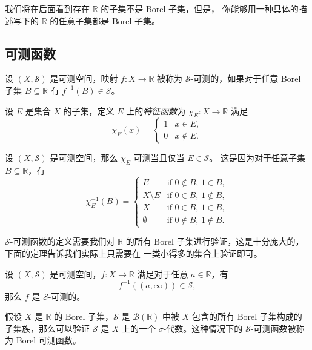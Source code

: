 \documentclass[fontset=none]{Notes}
\begin{document}
我们将在后面看到存在 $\mathbb{R}$ 的子集不是 Borel 子集，但是，
你能够用一种具体的描述写下的 $\mathbb{R}$ 的任意子集都是 Borel 子集。

\subsection{可测函数}

\begin{definition}
  设 $(X,\mathcal{S})$ 是可测空间，映射 $f:X\to \mathbb{R}$ 被称为
  $\mathcal{S}$-可测的，如果对于任意 Borel 子集 $B\subseteq \mathbb{R}$
  有 $f^{-1}(B)\in \mathcal{S}$。
\end{definition}

\begin{definition}
  设 $E$ 是集合 $X$ 的子集，定义 $E$ 上的\emph{特征函数}为 $\chi_E:X\to \mathbb{R}$
  满足 
  \[
    \chi_E(x)=\begin{cases}
      1 & x\in E,\\
      0 & x\notin E.
    \end{cases}
  \]
\end{definition}

\begin{example}
  设 $(X,\mathcal{S})$ 是可测空间，那么 $\chi_E$ 可测当且仅当 $E\in \mathcal{S}$。
  这是因为对于任意子集 $B\subseteq \mathbb{R}$，有
  \[
    \chi_E^{-1}(B)=\begin{cases}
      E & \text{if $0\notin B$, $1\in B$},\\
      X \setminus E & \text{if $0\in B$, $1\notin B$},\\
      X & \text{if $0\in B$, $1\in B$},\\
      \emptyset & \text{if $0\notin B$, $1\notin B$}.
    \end{cases}
  \]
\end{example}

$\mathcal{S}$-可测函数的定义需要我们对 $\mathbb{R}$ 的所有 Borel
子集进行验证，这是十分庞大的，下面的定理告诉我们实际上只需要在
一类小得多的集合上验证即可。

\begin{theorem}
  设 $(X,\mathcal{S})$ 是可测空间，$f:X\to \mathbb{R}$ 满足对于任意
  $a\in \mathbb{R}$，有
  \[
    f^{-1}((a,\infty))\in \mathcal{S},
  \]
  那么 $f$ 是 $\mathcal{S}$-可测的。
\end{theorem}

假设 $X$ 是 $\mathbb{R}$ 的 Borel 子集，$\mathcal{S}$ 是 $\mathcal{B}(\mathbb{R})$
中被 $X$ 包含的所有 Borel 子集构成的子集族，那么可以验证 $\mathcal{S}$
是 $X$ 上的一个 $\sigma$-代数。这种情况下的 $\mathcal{S}$-可测函数被称为
Borel 可测函数。
\end{document}
